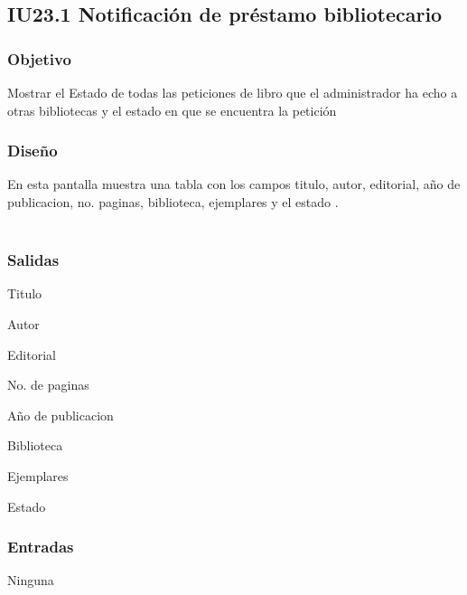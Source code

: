 \newpage
\subsection{IU23.1 Notificación de préstamo bibliotecario}

\subsubsection{Objetivo}
	Mostrar el Estado de todas las peticiones de libro que el administrador ha echo a otras bibliotecas y el estado en que se encuentra la petición

\subsubsection{Diseño}
	En esta pantalla muestra una tabla con los campos titulo, autor, editorial, año de publicacion, no. paginas, biblioteca, ejemplares y el estado .  \\\\


\subsubsection{Salidas}
	\begin{Citemize}
		\item Titulo 
		\item Autor
		\item Editorial
		\item No. de paginas
		\item Año de publicacion
		\item Biblioteca
		\item Ejemplares
		\item Estado
	\end{Citemize}
	
\subsubsection{Entradas}
	\begin{Citemize}
		\item Ninguna
	\end{Citemize}


